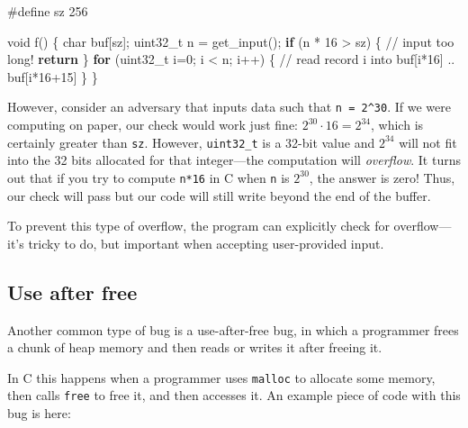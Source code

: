 \documentclass[
  letterpaper,
]{scrbook}
\newenvironment{Shaded}{\begin{snugshade}}{\end{snugshade}}
\newcommand{\CommentTok}[1]{\textcolor[rgb]{0.37,0.37,0.37}{#1}}
\newcommand{\ControlFlowTok}[1]{\textcolor[rgb]{0.00,0.23,0.31}{\textbf{#1}}}
\newcommand{\DataTypeTok}[1]{\textcolor[rgb]{0.68,0.00,0.00}{#1}}
\newcommand{\DecValTok}[1]{\textcolor[rgb]{0.68,0.00,0.00}{#1}}
\newcommand{\NormalTok}[1]{\textcolor[rgb]{0.00,0.23,0.31}{#1}}
\newcommand{\OperatorTok}[1]{\textcolor[rgb]{0.37,0.37,0.37}{#1}}
\newcommand{\PreprocessorTok}[1]{\textcolor[rgb]{0.68,0.00,0.00}{#1}}
\theoremstyle{definition}
\theoremstyle{plain}
\theoremstyle{plain}
\theoremstyle{remark}
\begin{document}
\begin{Shaded}
\begin{Highlighting}[]
\PreprocessorTok{\#define sz }\DecValTok{256}

\DataTypeTok{void}\NormalTok{ f}\OperatorTok{()} \OperatorTok{\{}
    \DataTypeTok{char}\NormalTok{ buf}\OperatorTok{[}\NormalTok{sz}\OperatorTok{];}
    \DataTypeTok{uint32\_t}\NormalTok{ n }\OperatorTok{=}\NormalTok{ get\_input}\OperatorTok{();}
    \ControlFlowTok{if} \OperatorTok{(}\NormalTok{n }\OperatorTok{*} \DecValTok{16} \OperatorTok{\textgreater{}}\NormalTok{ sz}\OperatorTok{)} \OperatorTok{\{}
        \CommentTok{// input too long!}
        \ControlFlowTok{return}
    \OperatorTok{\}}
    \ControlFlowTok{for} \OperatorTok{(}\DataTypeTok{uint32\_t}\NormalTok{ i}\OperatorTok{=}\DecValTok{0}\OperatorTok{;}\NormalTok{ i }\OperatorTok{\textless{}}\NormalTok{ n}\OperatorTok{;}\NormalTok{ i}\OperatorTok{++)} \OperatorTok{\{}
        \CommentTok{// read record i into buf[i*16] .. buf[i*16+15]}
    \OperatorTok{\}}
\OperatorTok{\}}
\end{Highlighting}
\end{Shaded}

However, consider an adversary that inputs data such that
\texttt{n\ =\ 2\^{}30}. If we were computing on paper, our check would
work just fine: \(2^{30} \cdot 16 = 2^{34}\), which is certainly greater
than \texttt{sz}. However, \texttt{uint32\_t} is a 32-bit value and
\(2^{34}\) will not fit into the 32 bits allocated for that
integer---the computation will \emph{overflow}. It turns out that if you
try to compute \texttt{n*16} in C when \texttt{n} is \(2^{30}\), the
answer is zero! Thus, our check will pass but our code will still write
beyond the end of the buffer.

To prevent this type of overflow, the program can explicitly check for
overflow---it's tricky to do, but important when accepting user-provided
input.

\subsection{Use after free}\label{use-after-free}

Another common type of bug is a use-after-free bug, in which a
programmer frees a chunk of heap memory and then reads or writes it
after freeing it.

In C this happens when a programmer uses \texttt{malloc} to allocate
some memory, then calls \texttt{free} to free it, and then accesses it.
An example piece of code with this bug is here:
\end{document}
